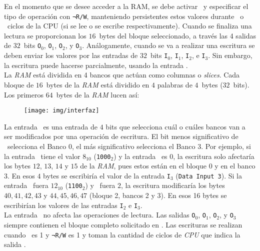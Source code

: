 \documentclass[12pt]{amsart}
\begin{document}
	En el momento que se desee acceder a la RAM, se debe activar \CS\ y especificar el tipo de operación con \texttt{¬R/W}, manteniendo persistentes estos valores durante \RT\ o \WT\ ciclos de la CPU (si se lee o se escribe respectivamente). Cuando se finaliza una lectura se proporcionan los $16$~bytes del bloque seleccionado, a través las 4 salidas de $32$~bits \texttt{O}$_0$, \texttt{O}$_1$, \texttt{O}$_2$, y \texttt{O}$_3$. Análogamente, cuando se va a realizar una escritura se deben enviar los valores por las entradas de $32$~bits \texttt{I}$_0$, \texttt{I}$_1$, \texttt{I}$_2$, e \texttt{I}$_3$. Sin embargo, la escritura puede hacerse parcialmente, usando la entrada \MASK.\\

	La \textit{RAM} está dividida en 4 bancos que actúan como columnas o \textit{slices}. Cada bloque de $16$~bytes de la \textit{RAM} está dividido en $4$ palabras de $4$~bytes ($32$~bits). Los primeros $64$~bytes de la \textit{RAM} lucen así:
	\begin{figure}[H]
		\centering
		\texttt{[image: img/interfaz]}
		\label{fig:interfaz}
	\end{figure}

	La entrada \MASK\ es una entrada de $4$ bits que selecciona cuál o cuáles bancos van a ser modificados por una operación de escritura. El bit menos significativo de \MASK\ selecciona el Banco 0, el más significativo selecciona el Banco 3. Por ejemplo, si la entrada \MASK\ tiene el valor $8_{10}$ (\texttt{1000}$_2$) y la entrada \ADDR\ es $0$, la escritura solo afectaría los bytes $12$, $13$, $14$ y $15$ de la \textit{RAM}, pues estos están en el bloque $0$ y en el banco $3$. En esos $4$ bytes se escribiría el valor de la entrada \texttt{I}$_3$ (\texttt{Data Input 3}). Si la entrada \MASK\ fuera $12_{10}$ (\texttt{1100}$_2$) y \ADDR\ fuera $2$, la escritura modificaría los bytes $40, 41, 42, 43$ y $44, 45, 46, 47$ (bloque 2, bancos 2 y 3). En esos 16 bytes se escribirían los valores de las entradas \texttt{I}$_2$ e \texttt{I}$_3$.\\
	
	La entrada \MASK\ no afecta las operaciones de lectura. Las salidas \texttt{O}$_0$, \texttt{O}$_1$, \texttt{O}$_2$, y \texttt{O}$_3$ siempre contienen el bloque completo solicitado en \ADDR. Las escrituras se realizan cuando \CS\ es 1 y \texttt{¬R/W} es 1 y toman la cantidad de ciclos de \textit{CPU} que indica la salida \WT.
	
\end{document}
